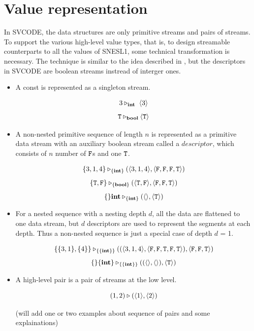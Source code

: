 \section{Value representation}
In SVCODE, the data structures are only primitive streams and pairs of streams. 
To support the various high-level value types, that is, to design streamable counterparts to all the values of SNESL1, some technical transformation is necessary.  
The technique is similar to the idea described in \cite{prins93}, but the descriptors in SVCODE are boolean streams instread of interger ones.

\begin{itemize}
	\item A const is represented as a singleton stream. 
	\begin{example}
		$$3 \tr_\int \ \< 3 \'>$$
		$$ \mathtt{T} \triangleright_{\mathbf{bool}} \langle \mathtt{T} \rangle $$
	\end{example}
	
	
	
	\item A non-nested primitive sequence of length $n$ is represented as a primitive data stream with an auxiliary boolean stream called a $descriptor$, which consists of $n$ number of $\mathtt{F}$s and one $\mathtt{T}$. 
	\begin{example}
		$$\{3,1,4\} \tr_{\{\int\}} (\< 3,1,4 \'>, \< \F, \F,\F , \T \'>) $$
	    $$\{\T,\F\} \tr_{\{\bool\}} (\< \T,\F\'>, \< \F,\F , \T \'>) $$
		$$\{\}\mathbf{int} \triangleright_{\{\mathbf{int} \}} (\langle \rangle, \langle \mathtt{T} \rangle)$$
	\end{example}
	
	\item For a nested sequence with a nesting depth $d$, all the data are flattened to one data stream, but $d$ descriptors are used to represent the segments at each depth. 
	Thus a non-nested sequence is just a special case of depth $d$ = 1.
	
	\begin{example}
		$$\{\{3,1\}, \{4\}\} \tr_{\{\{\int\}\}} ((\< 3,1,4 \'>, \<\F,\F,\T,\F,\T \'>),\< \F, \F, \T \'>)  $$
		$$\{\}\{\mathbf{int}\} \triangleright_{\{\{\mathbf{int}\}\}} ((\langle \rangle, \langle \rangle), \langle \mathtt{T} \rangle)$$
	\end{example}
	
%	
%

\item A high-level pair is a pair of streams at the low level.  
\begin{example}
	$$(1,2) \triangleright (\langle 1 \rangle, \langle 2 \rangle)$$
\end{example} 

(will add one or two examples about sequence of pairs and some explainations)
\end{itemize}

